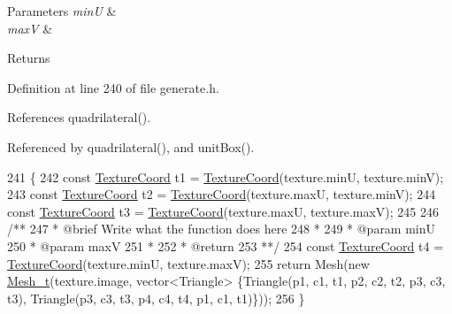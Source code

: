 \begin{DoxyParams}{Parameters}
{\em min\+U} & \\
\hline
{\em max\+V} & \\
\hline
\end{DoxyParams}
\begin{DoxyReturn}{Returns}

\end{DoxyReturn}


Definition at line 240 of file generate.\+h.



References quadrilateral().



Referenced by quadrilateral(), and unit\+Box().


\begin{DoxyCode}
241     \{
242         \textcolor{keyword}{const} \hyperlink{structTextureCoord}{TextureCoord} t1 = \hyperlink{structTextureCoord}{TextureCoord}(texture.minU, texture.minV);
243         \textcolor{keyword}{const} \hyperlink{structTextureCoord}{TextureCoord} t2 = \hyperlink{structTextureCoord}{TextureCoord}(texture.maxU, texture.minV);
244         \textcolor{keyword}{const} \hyperlink{structTextureCoord}{TextureCoord} t3 = \hyperlink{structTextureCoord}{TextureCoord}(texture.maxU, texture.maxV);
245 \textcolor{comment}{}
246 \textcolor{comment}{        /**}
247 \textcolor{comment}{         * @brief Write what the function does here}
248 \textcolor{comment}{         *}
249 \textcolor{comment}{         * @param minU}
250 \textcolor{comment}{         * @param maxV}
251 \textcolor{comment}{         *}
252 \textcolor{comment}{         * @return}
253 \textcolor{comment}{         **/}
254         \textcolor{keyword}{const} \hyperlink{structTextureCoord}{TextureCoord} t4 = \hyperlink{structTextureCoord}{TextureCoord}(texture.minU, texture.maxV);
255         \textcolor{keywordflow}{return} Mesh(\textcolor{keyword}{new} \hyperlink{classMesh__t}{Mesh\_t}(texture.image, vector<Triangle> \{Triangle(p1, c1, t1, p2, c2, t2, p3, 
      c3, t3), Triangle(p3, c3, t3, p4, c4, t4, p1, c1, t1)\}));
256     \}
\end{DoxyCode}
